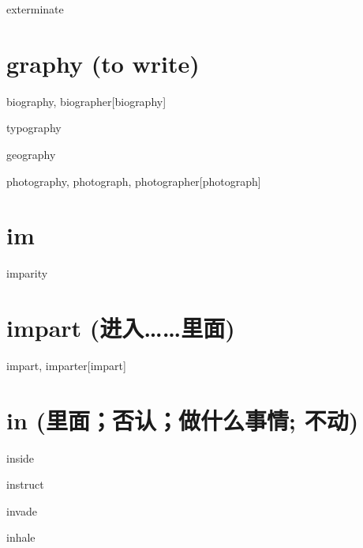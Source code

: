 \begin{RefWord}{exterminate}
\end{RefWord}

\section{graphy (to write)}

\begin{RefWord}{biography, biographer}[biography]
\end{RefWord}

\begin{RefWord}{typography}
\end{RefWord}

\begin{RefWord}{geography}
\end{RefWord}

\begin{RefWord}{photography, photograph, photographer}[photograph]
\end{RefWord}

\section{im}

\begin{RefWord}{imparity}
\end{RefWord}

\section{impart (进入……里面)}
\begin{RefWord}{impart, imparter}[impart]
\end{RefWord}

\section{in (里面；否认；做什么事情; 不动)}

\begin{RefWord}{inside}
\end{RefWord}

\begin{RefWord}{instruct}
\end{RefWord}

\begin{RefWord}{invade}
\end{RefWord}

\begin{RefWord}{inhale}
\end{RefWord}

